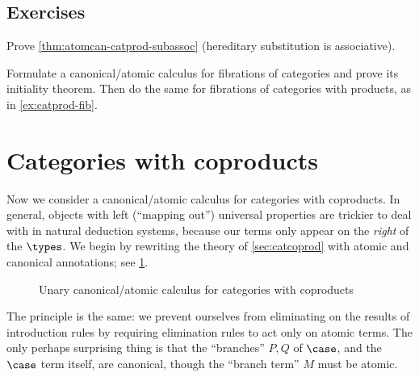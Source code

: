 \subsection*{Exercises}

\begin{ex}\label{ex:atomcan-catprod-subassoc}
  Prove \cref{thm:atomcan-catprod-subassoc} (hereditary substitution is associative).
\end{ex}

\begin{ex}\label{ex:atomcan-catfib}
  Formulate a canonical/atomic calculus for fibrations of categories and prove its initiality theorem.
  Then do the same for fibrations of categories with products, as in \cref{ex:catprod-fib}.
\end{ex}


\section{Categories with coproducts}
\label{sec:atomcan-catcoprod}

Now we consider a canonical/atomic calculus for categories with coproducts.
In general, objects with left (``mapping out'') universal properties are trickier to deal with in natural deduction systems, because our terms only appear on the \emph{right} of the $\types$.
We begin by rewriting the theory of \cref{sec:catcoprod} with atomic and canonical annotations; see \cref{fig:catcoprod-atomcan}.
\begin{figure}
  \centering
  \caption{Unary canonical/atomic calculus for categories with coproducts}
  \label{fig:catcoprod-atomcan}
\end{figure}
The principle is the same: we prevent ourselves from eliminating on the results of introduction rules by requiring elimination rules to act only on atomic terms.
The only perhaps surprising thing is that the ``branches'' $P,Q$ of $\case$, and the $\case$ term itself, are canonical, though the ``branch term'' $M$ must be atomic.

